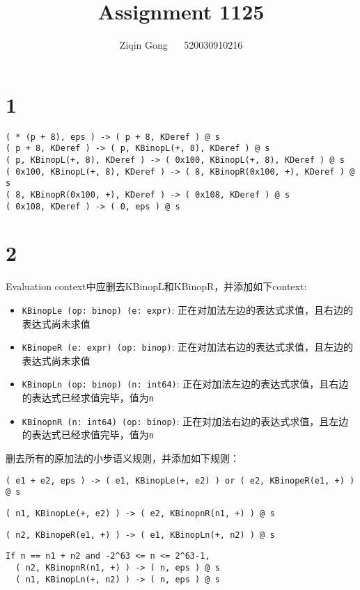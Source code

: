 \documentclass[11pt]{article}
\title{Assignment 1125}
\author{Ziqin Gong $\quad$ 520030910216}
\date{}
\begin{document}
  \maketitle

  \section*{1}

    \begin{lstlisting}
( * (p + 8), eps ) -> ( p + 8, KDeref ) @ s
( p + 8, KDeref ) -> ( p, KBinopL(+, 8), KDeref ) @ s
( p, KBinopL(+, 8), KDeref ) -> ( 0x100, KBinopL(+, 8), KDeref ) @ s
( 0x100, KBinopL(+, 8), KDeref ) -> ( 8, KBinopR(0x100, +), KDeref ) @ s
( 8, KBinopR(0x100, +), KDeref ) -> ( 0x108, KDeref ) @ s
( 0x108, KDeref ) -> ( 0, eps ) @ s
    \end{lstlisting}

  \section*{2}

    Evaluation context中应删去KBinopL和KBinopR，并添加如下context:
    \begin{itemize}
      \item \texttt{KBinopLe (op: binop) (e: expr)}: 正在对加法左边的表达式求值，且右边的表达式尚未求值
      \item \texttt{KBinopeR (e: expr) (op: binop)}: 正在对加法右边的表达式求值，且左边的表达式尚未求值
      \item \texttt{KBinopLn (op: binop) (n: int64)}: 正在对加法左边的表达式求值，且右边的表达式已经求值完毕，值为\texttt{n}
      \item \texttt{KBinopnR (n: int64) (op: binop)}: 正在对加法右边的表达式求值，且左边的表达式已经求值完毕，值为\texttt{n}
    \end{itemize}

    删去所有的原加法的小步语义规则，并添加如下规则：
    \begin{lstlisting}
( e1 + e2, eps ) -> ( e1, KBinopLe(+, e2) ) or ( e2, KBinopeR(e1, +) ) @ s
    \end{lstlisting}
    \begin{lstlisting}
( n1, KBinopLe(+, e2) ) -> ( e2, KBinopnR(n1, +) ) @ s
    \end{lstlisting}
    \begin{lstlisting}
( n2, KBinopeR(e1, +) ) -> ( e1, KBinopLn(+, n2) ) @ s
    \end{lstlisting}
    \begin{lstlisting}
If n == n1 + n2 and -2^63 <= n <= 2^63-1,
  ( n2, KBinopnR(n1, +) ) -> ( n, eps ) @ s
  ( n1, KBinopLn(+, n2) ) -> ( n, eps ) @ s
    \end{lstlisting}
\end{document}
